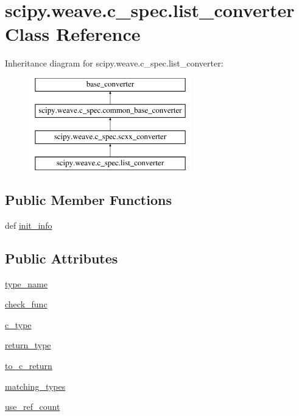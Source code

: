 \hypertarget{classscipy_1_1weave_1_1c__spec_1_1list__converter}{}\section{scipy.\+weave.\+c\+\_\+spec.\+list\+\_\+converter Class Reference}
\label{classscipy_1_1weave_1_1c__spec_1_1list__converter}
Inheritance diagram for scipy.\+weave.\+c\+\_\+spec.\+list\+\_\+converter\+:\begin{figure}[H]
\begin{center}
\leavevmode
\includegraphics[height=4.000000cm]{classscipy_1_1weave_1_1c__spec_1_1list__converter}
\end{center}
\end{figure}
\subsection*{Public Member Functions}
\begin{DoxyCompactItemize}
\item 
def \hyperlink{classscipy_1_1weave_1_1c__spec_1_1list__converter_a40c30b9cd1e8c6c484b21dfe43b137a1}{init\+\_\+info}
\end{DoxyCompactItemize}
\subsection*{Public Attributes}
\begin{DoxyCompactItemize}
\item 
\hyperlink{classscipy_1_1weave_1_1c__spec_1_1list__converter_a9428773f5975c1019d9492718970351c}{type\+\_\+name}
\item 
\hyperlink{classscipy_1_1weave_1_1c__spec_1_1list__converter_a6e46b972dc08dd6000c665d8ab6fc570}{check\+\_\+func}
\item 
\hyperlink{classscipy_1_1weave_1_1c__spec_1_1list__converter_a8253bf0db509e3da3dba806abd83b317}{c\+\_\+type}
\item 
\hyperlink{classscipy_1_1weave_1_1c__spec_1_1list__converter_a2d358582eed6b9cb3c837fbdfdc7ff43}{return\+\_\+type}
\item 
\hyperlink{classscipy_1_1weave_1_1c__spec_1_1list__converter_a581feb085d1f74819682c478a8f3287a}{to\+\_\+c\+\_\+return}
\item 
\hyperlink{classscipy_1_1weave_1_1c__spec_1_1list__converter_a7df70a63c42f99f808bc6b828fdfc9c2}{matching\+\_\+types}
\item 
\hyperlink{classscipy_1_1weave_1_1c__spec_1_1list__converter_a7a1241ca2064d71d8f4f7586406d6ccc}{use\+\_\+ref\+\_\+count}
\end{DoxyCompactItemize}


